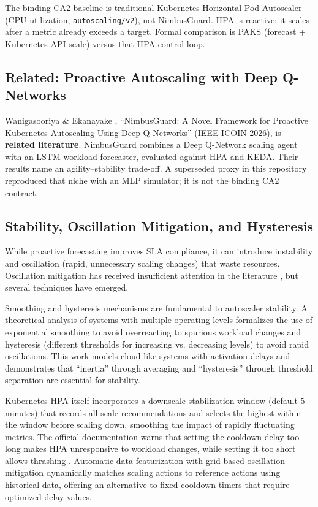 The binding CA2 baseline is traditional Kubernetes Horizontal Pod Autoscaler (CPU utilization, \texttt{autoscaling/v2}), not NimbusGuard. HPA is reactive: it scales after a metric already exceeds a target. Formal comparison is PAKS (forecast + Kubernetes API scale) versus that HPA control loop.

\subsection{Related: Proactive Autoscaling with Deep Q-Networks}

Wanigasooriya \& Ekanayake \cite{Wanigasooriya26}, ``NimbusGuard: A Novel Framework for Proactive Kubernetes Autoscaling Using Deep Q-Networks'' (IEEE ICOIN 2026), is \textbf{related literature}. NimbusGuard combines a Deep Q-Network scaling agent with an LSTM workload forecaster, evaluated against HPA and KEDA. Their results name an agility--stability trade-off. A superseded proxy in this repository reproduced that niche with an MLP simulator; it is not the binding CA2 contract.

\subsection{Stability, Oscillation Mitigation, and Hysteresis}

While proactive forecasting improves SLA compliance, it can introduce instability and oscillation (rapid, unnecessary scaling changes) that waste resources. Oscillation mitigation has received insufficient attention in the literature \cite{OscillationMitigation24}, but several techniques have emerged.

Smoothing and hysteresis mechanisms are fundamental to autoscaler stability. A theoretical analysis of systems with multiple operating levels \cite{MultipleOperatingLevels18} formalizes the use of exponential smoothing to avoid overreacting to spurious workload changes and hysteresis (different thresholds for increasing vs. decreasing levels) to avoid rapid oscillations. This work models cloud-like systems with activation delays and demonstrates that ``inertia'' through averaging and ``hysteresis'' through threshold separation are essential for stability.

Kubernetes HPA itself incorporates a downscale stabilization window (default 5 minutes) that records all scale recommendations and selects the highest within the window before scaling down, smoothing the impact of rapidly fluctuating metrics. The official documentation warns that setting the cooldown delay too long makes HPA unresponsive to workload changes, while setting it too short allows thrashing \cite{K8sHPADoc}. Automatic data featurization with grid-based oscillation mitigation \cite{GridOscillation24} dynamically matches scaling actions to reference actions using historical data, offering an alternative to fixed cooldown timers that require optimized delay values.

